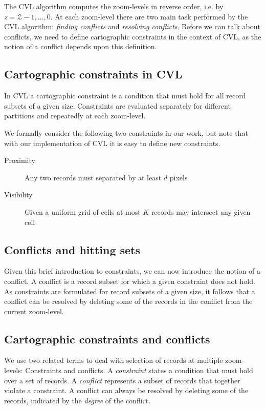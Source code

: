 The CVL algorithm computes the zoom-levels in reverse order, i.e. by $z = \mathcal{Z}-1, \dots, 0$. At each zoom-level there are two main task performed by the CVL algorithm: \emph{finding conflicts} and \emph{resolving conflicts}. Before we can talk about conflicts, we need to define cartographic constraints in the context of CVL, as the notion of a conflict depends upon this definition.

\subsection{Cartographic constraints in CVL}

In CVL a cartographic constraint is a condition that must hold for all record subsets of a given size. Constraints are evaluated separately for different partitions and repeatedly at each zoom-level.

We formally consider the following two constraints in our work, but note that with our implementation of CVL it is easy to define new constraints. 

\begin{description}
\item [Proximity] Any two records must separated by at least $d$ pixels
\item [Visibility] Given a uniform grid of cells at most $K$ records may intersect any given cell
\end{description}

\subsection{Conflicts and hitting sets}

Given this brief introduction to constraints, we can now introduce the notion of a conflict. 
A conflict is a record subset for which a given constraint does not hold. As constraints are formulated for record subsets of a given size, it follows that a conflict can be resolved by deleting some of the records in the conflict from the current zoom-level.


\subsection{Cartographic constraints and conflicts}

We use two related terms to deal with selection of records at multiple zoom-levels: Constraints and conflicts. A \emph{constraint} states a condition that must hold over a set of records. A \emph{conflict} represents a subset of records that together violate a constraint. A conflict can always be resolved by deleting some of the records, indicated by the \emph{degree} of the conflict.

